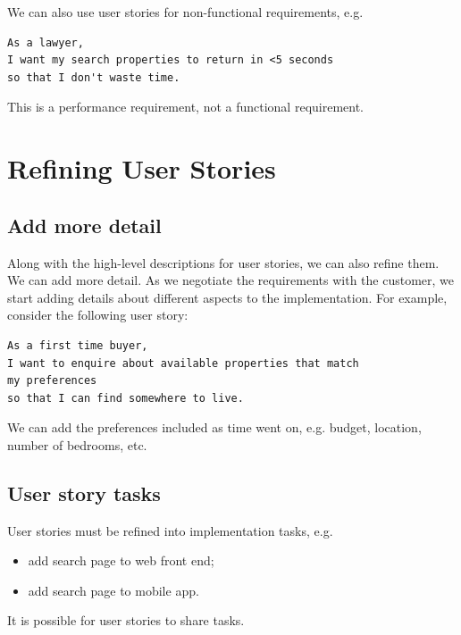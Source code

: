 \documentclass[a4paper, openany]{memoir}
\begin{document}
We can also use user stories for non-functional requirements, e.g.
\begin{verbatim}
As a lawyer,
I want my search properties to return in <5 seconds
so that I don't waste time.
\end{verbatim}
This is a performance requirement, not a functional requirement.

\section{Refining User Stories}
\subsection{Add more detail}
Along with the high-level descriptions for user stories, we can also refine them. We can add more detail. As we negotiate the requirements with the customer, we start adding details about different aspects to the implementation. For example, consider the following user story:
\begin{verbatim}
As a first time buyer,
I want to enquire about available properties that match 
my preferences
so that I can find somewhere to live.
\end{verbatim}
We can add the preferences included as time went on, e.g. budget, location, number of bedrooms, etc.

\subsection{User story tasks}
User stories must be refined into implementation tasks, e.g.
\begin{itemize}
    \item add search page to web front end;
    \item add search page to mobile app.
\end{itemize}
It is possible for user stories to share tasks.
\end{document}
